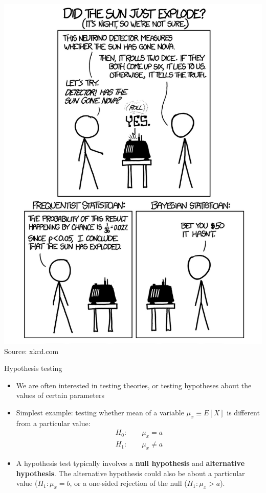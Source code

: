 \begin{frame}
\begin{center}
\includegraphics[height=.92\textheight]{explode} \\
{\tiny Source: xkcd.com}
\end{center}
\end{frame}


\begin{frame}{Hypothesis testing}
\begin{itemize}
	\item We are often interested in testing theories, or testing hypotheses about
	the values of certain parameters

	\medskip
	\item Simplest example: testing whether mean of a variable $\mu_x \equiv E\left[X\right]$ 
	is different from a particular value:\[
\begin{array}{c}
H_{0}:\qquad\mu_{x}=a\\
H_{1}:\qquad\mu_{x}\ne a
\end{array}
\]

	\medskip
	\item A hypothesis test typically involves a {\bf null hypothesis} and {\bf alternative hypothesis}. 
	The alternative hypothesis could also be about a particular value ($H_{1}:\mu_{x}= b$, or 
	a one-sided rejection of the null ($H_{1}:\mu_{x}>a$).


\end{itemize}
\end{frame}



